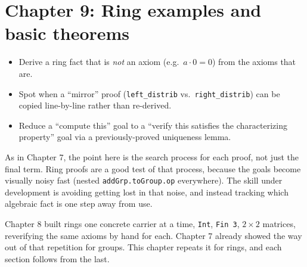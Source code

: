 \chapter{Chapter 9: Ring examples and basic theorems}\label{sec:09-ring-theorems:00-index:1}

\begin{learningobjectives}
\begin{itemize}
\tightlist
\item
  Derive a ring fact that is \emph{not} an axiom (e.g.~\(a\cdot 0=0\)) from the axioms that are.
\item
  Spot when a ``mirror'' proof (\texttt{left\_\allowbreak{}distrib} vs.~\texttt{right\_\allowbreak{}distrib}) can be copied line-by-line rather than re-derived.
\item
  Reduce a ``compute this'' goal to a ``verify this satisfies the characterizing property'' goal via a previously-proved uniqueness lemma.
\end{itemize}
\end{learningobjectives}


As in Chapter 7, the point here is the search process for each proof, not just the final term. Ring proofs are a good test of that process, because the goals become visually noisy fast (nested \texttt{addGrp.toGroup.op} everywhere). The skill under development is avoiding getting lost in that noise, and instead tracking which algebraic fact is one step away from use.

Chapter 8 built rings one concrete carrier at a time, \texttt{Int}, \texttt{Fin 3}, \(2\times 2\) matrices, reverifying the same axioms by hand for each. Chapter 7 already showed the way out of that repetition for groups. This chapter repeats it for rings, and each section follows from the last.

